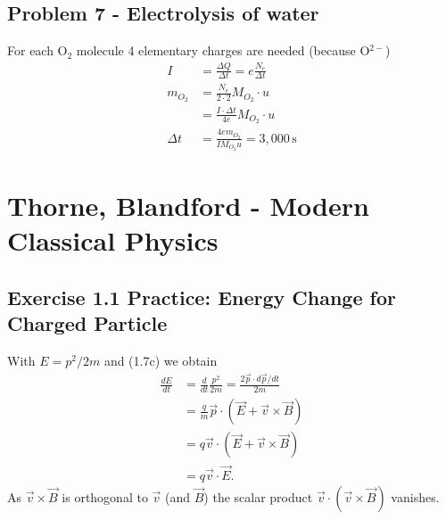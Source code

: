 \documentclass[../main.tex]{subfiles}
\begin{document}
\subsection{Problem 7 - Electrolysis of water}
For each O$_2$ molecule 4 elementary charges are needed (because O$^{2-}$)
\begin{align}
I&=\frac{\Delta Q}{\Delta t}=e\frac{N_e}{\Delta t}\\
m_{O_2}
&=\frac{N_e}{2\cdot 2}M_{O_2}\cdot u\\
&=\frac{I\cdot\Delta t}{4e}M_{O_2}\cdot u\\
\Delta t&=\frac{4em_{O_2}}{IM_{O_2}u}=3,000\,\text{s}
\end{align}





\section{{\sc Thorne, Blandford} - Modern Classical Physics}
\subsection{Exercise 1.1 Practice: Energy Change for Charged Particle}
With $E=p^2/2m$ and (1.7c) we obtain
\begin{align}
    \frac{dE}{dt}&=\frac{d}{dt}\frac{p^2}{2m}=\frac{2 \vec{p}\cdot d\vec{p}/dt}{2m}\\
    &=\frac{q}{m}\vec{p}\cdot (\vec{E}+\vec{v}\times\vec{B})\\
    &=q\vec{v}\cdot (\vec{E}+\vec{v}\times\vec{B})\\
    &=q\vec{v}\cdot\vec{E}.
\end{align}
As $\vec{v}\times\vec{B}$ is orthogonal to $\vec{v}$ (and $\vec{B}$) the scalar product $\vec{v}\cdot(\vec{v}\times\vec{B})$ vanishes.
\end{document}
